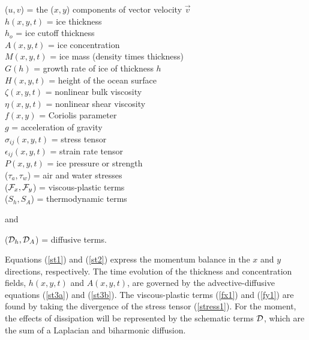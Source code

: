 \begin{center}
  ($u,v$) = the ($x,y$) components of vector velocity $\vec{v}$ \\
\vspace{1mm}
  $h(x,y,t)$ = ice thickness \\
\vspace{1mm}
  $h_o$ = ice cutoff thickness \\
\vspace{1mm}
  $A(x,y,t)$ = ice concentration \\
\vspace{1mm}
  $M(x,y,t)$ = ice mass (density times thickness) \\
\vspace{1mm}
  $G(h)$ = growth rate of ice of thickness $h$ \\
\vspace{1mm}
  $H(x,y,t)$ = height of the ocean surface \\
\vspace{1mm}
  $\zeta(x,y,t)$ = nonlinear bulk viscosity \\
\vspace{1mm}
  $\eta(x,y,t)$ = nonlinear shear viscosity \\
\vspace{1mm}
  $f(x,y)$ = Coriolis parameter \\
\vspace{1mm}
  $g$ = acceleration of gravity \\
\vspace{1mm}
  $\sigma_{ij}(x,y,t)$ = stress tensor \\
\vspace{1mm}
  $\epsilon_{ij}(x,y,t)$ = strain rate tensor \\
\vspace{1mm}
  $P(x,y,t)$ = ice pressure or strength \\
\vspace{1mm}
  ($\tau_a, \tau_w$) = air and water stresses \\
\vspace{1mm}
  (${\cal F}_x, {\cal F}_y$) = viscous-plastic terms \\
\vspace{1mm}
  ($S_h, S_A$) = thermodynamic terms
\end{center}
and
\begin{center}
  (${\cal D}_h, {\cal D}_A$) = diffusive terms.
\end{center}
Equations (\ref{st1}) and (\ref{st2}) express the momentum balance in
the $x$ and $y$ directions, respectively.  The time evolution of the
thickness and concentration fields, $h(x,y,t)$ and $A(x,y,t)$, are
governed by the advective-diffusive equations (\ref{st3a}) and
(\ref{st3b}).  The viscous-plastic terms (\ref{fx1}) and (\ref{fy1})
are found by taking the divergence of the stress tensor
(\ref{stress1}).  For the moment, the effects of dissipation will be
represented by the schematic terms ${\cal D}$, which are the sum of a
Laplacian and biharmonic diffusion.

